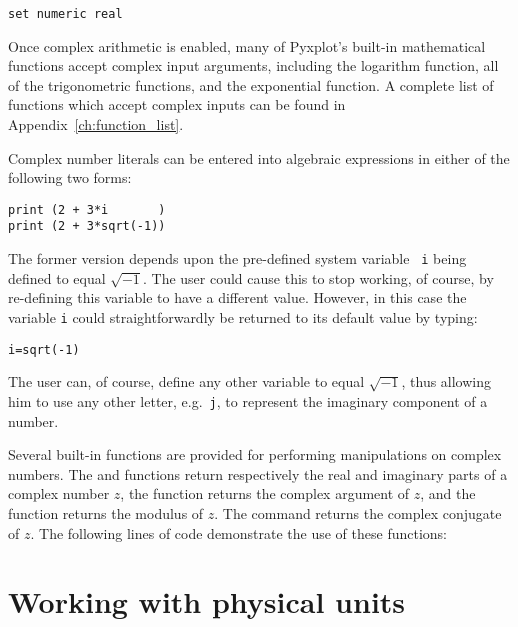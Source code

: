 \begin{verbatim}
set numeric real
\end{verbatim}

\noindent Once complex arithmetic is enabled, many of Pyxplot's built-in
mathematical functions accept complex input arguments, including the logarithm
function, all of the trigonometric functions, and the exponential function.  A
complete list of functions which accept complex inputs can be found in
Appendix~\ref{ch:function_list}.

Complex number literals can be entered into algebraic expressions in either of
the following two forms:

\begin{verbatim}
print (2 + 3*i       )
print (2 + 3*sqrt(-1))
\end{verbatim}

\noindent The former version depends upon the pre-defined system variable {\tt
i} being defined to equal $\sqrt{-1}$. The user could cause this to stop working,
of course, by re-defining this variable to have a different value.  However, in
this case the variable {\tt i} could straightforwardly be returned to its
default value by typing:

\begin{verbatim}
i=sqrt(-1)
\end{verbatim}

\noindent The user can, of course, define any other variable to equal
$\sqrt{-1}$, thus allowing him to use any other letter, e.g.\ {\tt j}, to
represent the imaginary component of a number.

Several built-in functions are provided for performing manipulations on complex
numbers. The  and  functions return respectively
the real and imaginary parts of a complex number $z$, the 
function returns the complex argument of $z$, and the  function
returns the modulus of $z$.  The  command returns the
complex conjugate of $z$. The following lines of code demonstrate the use of
these functions:

\vspace{3mm}

\vspace{3mm}

\section{Working with physical units}
\label{sec:units}

